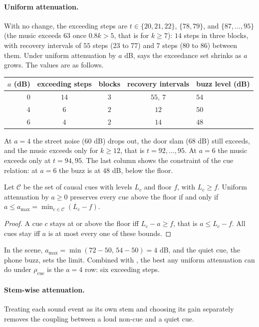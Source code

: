 \paragraph{Uniform attenuation.} With no change, the exceeding steps are $t\in\{20,21,22\}$, $\{78,79\}$, and $\{87,\dots,95\}$ (the music exceeds $63$ once $0.8k>5$, that is for $k\ge7$): $14$ steps in three blocks, with recovery intervals of $55$ steps (23 to 77) and $7$ steps (80 to 86) between them. Under uniform attenuation by $a$ dB,  says the exceedance set shrinks as $a$ grows. The values are as follows.
\begin{center}
\begin{tabular}{rcccl}
\toprule
$a$ (dB) & exceeding steps & blocks & recovery intervals & buzz level (dB)\\
\midrule
$0$ & $14$ & $3$ & $55,\ 7$ & $54$\\
$4$ & $6$ & $2$ & $12$ & $50$\\
$6$ & $4$ & $2$ & $14$ & $48$\\
\bottomrule
\end{tabular}
\end{center}
At $a=4$ the street noise ($60$ dB) drops out, the door slam ($68$ dB) still exceeds, and the music exceeds only for $k\ge12$, that is $t=92,\dots,95$. At $a=6$ the music exceeds only at $t=94,95$. The last column shows the constraint of the cue relation: at $a=6$ the buzz is at $48$ dB, below the floor.

\begin{proposition}\label{prop:cuesafe}
Let $\mathcal{C}$ be the set of causal cues with levels $L_c$ and floor $f$, with $L_c\ge f$. Uniform attenuation by $a\ge0$ preserves every cue above the floor if and only if $a\le a_{\max}=\min_{c\in\mathcal{C}}(L_c-f)$.
\end{proposition}

\begin{proof}
A cue $c$ stays at or above the floor iff $L_c-a\ge f$, that is $a\le L_c-f$. All cues stay iff $a$ is at most every one of these bounds.
\end{proof}

In the scene, $a_{\max}=\min(72-50,\,54-50)=4$ dB, and the quiet cue, the phone buzz, sets the limit. Combined with , the best any uniform attenuation can do under $\rho_{\mathrm{cue}}$ is the $a=4$ row: six exceeding steps.

\paragraph{Stem-wise attenuation.} Treating each sound event as its own stem and choosing its gain separately removes the coupling between a loud non-cue and a quiet cue.

